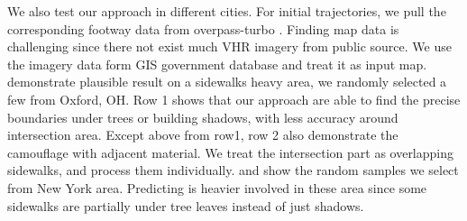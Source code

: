 We also test our approach in different cities. 
For initial trajectories, we pull the corresponding footway data from overpass-turbo \cite{overpass_turbo}.
Finding map data is challenging since there not exist much \ac{VHR} imagery from public source. 
We use the imagery data form GIS government database and treat it as input map. 
 demonstrate plausible result on a sidewalks heavy area, we randomly selected a few from Oxford, OH. 
Row 1 shows that our approach are able to find the precise boundaries under trees or building shadows, with less accuracy around intersection area. 
Except above from row1, row 2 also demonstrate the camouflage with adjacent material. 
We treat the intersection part as overlapping sidewalks, and process them individually.  and  show the random samples we select from New York area. 
Predicting is heavier involved in these area since some sidewalks are partially under tree leaves instead of just shadows. 



